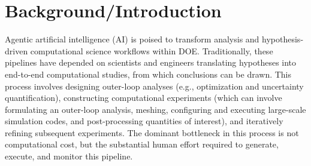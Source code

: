 \documentclass[11pt]{article} \usepackage[margin=1in]{geometry}
\begin{document}
\clearpage {}

\section{Background/Introduction} Agentic
artificial intelligence (AI) is poised to transform analysis and
hypothesis-driven computational science workflows within DOE.
Traditionally, these pipelines have depended on
scientists and engineers translating hypotheses into end-to-end computational
studies, from which conclusions can be drawn. This process involves designing outer-loop analyses (e.g.,
optimization and uncertainty quantification), constructing computational
experiments (which can involve formulating an outer-loop analysis, meshing, configuring and executing large-scale simulation codes,
and post-processing quantities of interest), and iteratively refining subsequent
experiments. The dominant bottleneck in this process is not computational cost,
but the substantial human effort required to generate, execute, and monitor this
pipeline.
\end{document}
